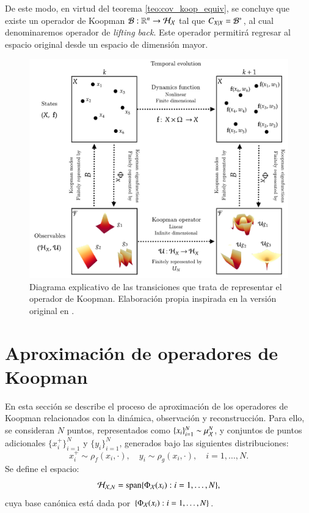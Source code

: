 De este modo, en virtud del teorema \ref{teo:cov_koop_equiv}, se concluye que existe un operador de Koopman $\mathcal{B} : \mathbb{R}^n \to \mathcal{H}_{\mathcal{X}}$ tal que $C_{X|X} = \mathcal{B}^*$, al cual denominaremos operador de \textit{lifting back}. Este operador permitirá regresar al espacio original desde un espacio de dimensión mayor.

\begin{figure}[h!]
    \centering
    \includegraphics[width=0.8\linewidth]{img/content/chapter3/KoopDiag.pdf}
    \caption{Diagrama explicativo de las transiciones que trata de representar el operador de Koopman. Elaboración propia inspirada en la versión original en \cite{Williams2015ADecomposition}.}
    \label{fig:KoopDiag}
\end{figure}

\section{Aproximación de operadores de Koopman}

En esta sección se describe el proceso de aproximación de los operadores de Koopman relacionados con la dinámica, observación y reconstrucción. Para ello, se consideran \( N \) puntos, representados como \( \{ x_i \}_{i=1}^N \sim \mu_{\mathcal{X}}^N \), y conjuntos de puntos adicionales \( \{ x^+_i \}_{i=1}^N \) y \( \{ y_i \}_{i=1}^N \), generados bajo las siguientes distribuciones:
\begin{equation*}
    x^+_i \sim \rho_f (x_i, \cdot), \quad y_i \sim \rho_g (x_i, \cdot), \quad i = 1, \dots, N.
\end{equation*}
Se define el espacio:
\begin{equation*}
    \mathcal{H}_{\mathcal{X}, N} = \text{span} \{\Phi_{\mathcal{X}} (x_i) : i = 1, \dots, N \},
\end{equation*}
cuya base canónica está dada por \( \{\Phi_{\mathcal{X}} (x_i) : i = 1, \dots, N \} \).

